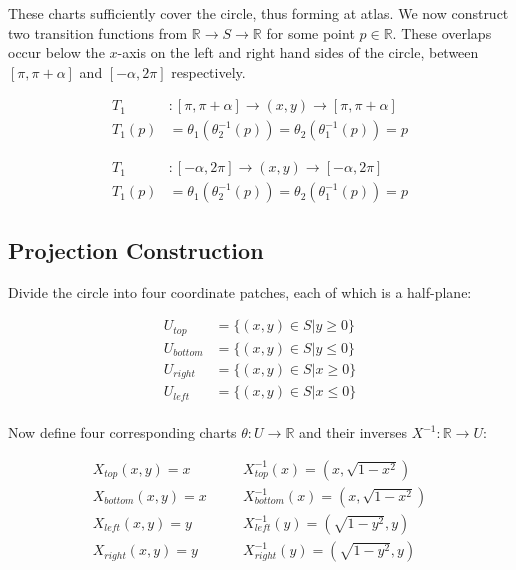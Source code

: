 \documentclass{article}
\newcommand{\lp}{\left(} %
\newcommand{\rp}{\right)} %
\begin{document}
        These charts sufficiently cover the circle, thus forming at atlas. We now construct two transition functions from $\mathbb{R} \rightarrow S \rightarrow \mathbb{R}$ for some point $p \in \mathbb{R}$. These overlaps occur below the $x$-axis on the left and right hand sides of the circle, between $[\pi, \pi + \alpha]$ and $[-\alpha, 2 \pi]$ respectively.

        \begin{align*}
            T_1 &: [\pi, \pi + \alpha] \rightarrow (x,y) \rightarrow [\pi, \pi + \alpha] \\
            T_1(p) &= \theta_1 \lp \theta_2^{-1}(p) \rp = \theta_2 \lp \theta_1^{-1}(p) \rp = p
        \end{align*}

        \begin{align*}
            T_1 &: [-\alpha, 2 \pi] \rightarrow (x,y) \rightarrow [- \alpha, 2 \pi] \\
            T_1(p) &= \theta_1 \lp \theta_2^{-1}(p) \rp = \theta_2 \lp \theta_1^{-1}(p) \rp = p
        \end{align*}

    \subsection{Projection Construction}

        Divide the circle into four coordinate patches, each of which is a half-plane:

        \begin{align*}
            U_{top} &= \{(x,y) \in S | y \geq 0 \} \\
            U_{bottom} &= \{(x,y) \in S | y \leq 0 \} \\
            U_{right} &= \{(x,y) \in S | x \geq 0 \} \\
            U_{left} &= \{(x,y) \in S | x \leq 0 \} \\
        \end{align*}

        Now define four corresponding charts $\theta: U \rightarrow \mathbb{R}$ and their inverses $X^{-1}: \mathbb{R}\rightarrow U$:

        \begin{align*}
            X_{top}(x,y) = x & \quad & X_{top}^{-1}(x) = (x, \sqrt{1 - x^2}) \\
            X_{bottom}(x,y) = x & \quad & X_{bottom}^{-1}(x) = (x, \sqrt{1 - x^2}) \\
            X_{left}(x,y) = y & \quad & X_{left}^{-1}(y) = (\sqrt{1 - y^2}, y) \\
            X_{right}(x,y) = y & \quad & X_{right}^{-1}(y) = (\sqrt{1 - y^2}, y)
        \end{align*}
\end{document}
